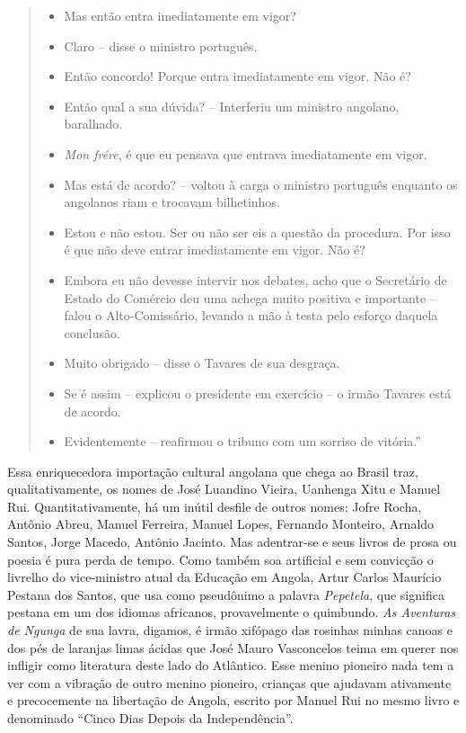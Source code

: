 \documentclass[
  letterpaper,
  DIV=11,
  numbers=noendperiod]{scrreprt}
\begin{document}
\begin{quote}
\begin{itemize}
\item
  Mas então entra imediatamente em vigor?
\item
  Claro -- disse o ministro português.
\item
  Então concordo! Porque entra imediatamente em vigor. Não é?
\item
  Então qual a sua dúvida? -- Interferiu um ministro angolano,
  baralhado.
\item
  \emph{Mon frére}, é que eu pensava que entrava imediatamente em vigor.
\item
  Mas está de acordo? -- voltou à carga o ministro português enquanto os
  angolanos riam e trocavam bilhetinhos.
\item
  Estou e não estou. Ser ou não ser eis a questão da procedura. Por isso
  é que não deve entrar imediatamente em vigor. Não é?
\item
  Embora eu não devesse intervir nos debates, acho que o Secretário de
  Estado do Comércio deu uma achega muito positiva e importante -- falou
  o Alto-Comissário, levando a mão à testa pelo esforço daquela
  conclusão.
\item
  Muito obrigado -- disse o Tavares de sua desgraça.
\item
  Se é assim -- explicou o presidente em exercício -- o irmão Tavares
  está de acordo.
\item
  Evidentemente -- reafirmou o tribuno com um sorriso de vitória.''
\end{itemize}
\end{quote}

Essa enriquecedora importação cultural angolana que chega ao Brasil
traz, qualitativamente, os nomes de José Luandino Vieira, Uanhenga Xitu
e Manuel Rui. Quantitativamente, há um inútil desfile de outros nomes:
Jofre Rocha, Antônio Abreu, Manuel Ferreira, Manuel Lopes, Fernando
Monteiro, Arnaldo Santos, Jorge Macedo, Antônio Jacinto. Mas adentrar-se
e seus livros de prosa ou poesia é pura perda de tempo. Como também soa
artificial e sem convicção o livrelho do vice-ministro atual da Educação
em Angola, Artur Carlos Maurício Pestana dos Santos, que usa como
pseudônimo a palavra \emph{Pepetela}, que significa pestana em um dos
idiomas africanos, provavelmente o quimbundo. \emph{As Aventuras de
Ngunga} de sua lavra, digamos, é irmão xifópago das rosinhas minhas
canoas e dos pés de laranjas limas ácidas que José Mauro Vasconcelos
teima em querer nos infligir como literatura deste lado do Atlântico.
Esse menino pioneiro nada tem a ver com a vibração de outro menino
pioneiro, crianças que ajudavam ativamente e precocemente na libertação
de Angola, escrito por Manuel Rui no mesmo livro e denominado ``Cinco
Dias Depois da Independência''.
\end{document}
